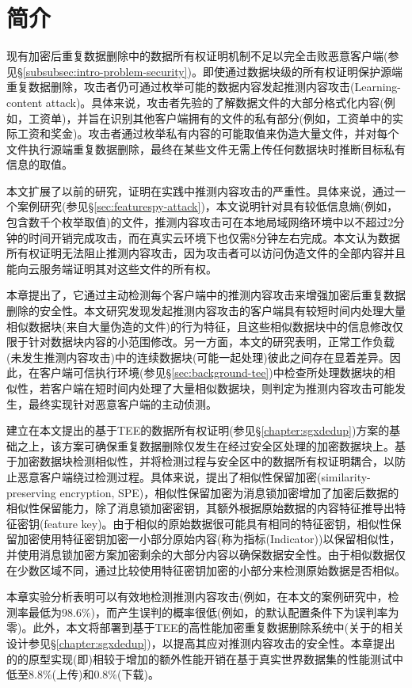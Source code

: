 \section{简介}
\label{sec:featurespy-intro}

现有加密后重复数据删除中的数据所有权证明机制不足以完全击败恶意客户端(参见\S\ref{subsubsec:intro-problem-security})。即使通过数据块级的所有权证明保护源端重复数据删除，攻击者仍可通过枚举可能的数据内容发起推测内容攻击(Learning-content attack)\cite{harnik2010side, zuo2018mitigating}。具体来说，攻击者先验的了解数据文件的大部分格式化内容(例如，工资单)，并旨在识别其他客户端拥有的文件的私有部分(例如，工资单中的实际工资和奖金)。攻击者通过枚举私有内容的可能取值来伪造大量文件，并对每个文件执行源端重复数据删除，最终在某些文件无需上传任何数据块时推断目标私有信息的取值。

本文扩展了以前的研究\cite{harnik2010side, zuo2018mitigating}，证明在实践中推测内容攻击的严重性。具体来说，通过一个案例研究(参见\S\ref{sec:featurespy-attack})，本文说明针对具有较低信息熵(例如，包含数千个枚举取值)的文件，推测内容攻击可在本地局域网络环境中以不超过2分钟的时间开销完成攻击，而在真实云环境下也仅需8分钟左右完成。本文认为数据所有权证明无法阻止推测内容攻击，因为攻击者可以访问伪造文件的全部内容并且能向云服务端证明其对这些文件的所有权。

本章提出了\sysnameF，它通过主动检测每个客户端中的推测内容攻击来增强加密后重复数据删除的安全性。本文研究发现发起推测内容攻击的客户端具有较短时间内处理大量相似数据块(来自大量伪造的文件)的行为特征，且这些相似数据块中的信息修改仅限于针对数据块内容的小范围修改。另一方面，本文的研究表明，正常工作负载(未发生推测内容攻击)中的连续数据块(可能一起处理)彼此之间存在显着差异。因此，\sysnameF 在客户端可信执行环境(参见\S\ref{sec:background-tee})中检查所处理数据块的相似性，若客户端在短时间内处理了大量相似数据块，则判定为推测内容攻击可能发生，最终实现针对恶意客户端的主动侦测。

\sysnameF 建立在本文提出的基于TEE的数据所有权证明(参见\S\ref{chapter:sgxdedup})方案的基础之上，该方案可确保重复数据删除仅发生在经过安全区处理的加密数据块上。\sysnameF 基于加密数据块检测相似性，并将检测过程与安全区中的数据所有权证明耦合，以防止恶意客户端绕过检测过程。具体来说，\sysnameF 提出了相似性保留加密(similarity-preserving
encryption, SPE)，相似性保留加密为消息锁加密增加了加密后数据的相似性保留能力，除了消息锁加密密钥，其额外根据原始数据的内容特征推导出特征密钥(feature key)。由于相似的原始数据很可能具有相同的特征密钥，相似性保留加密使用特征密钥加密一小部分原始内容(称为指标(Indicator))以保留相似性，并使用消息锁加密方案加密剩余的大部分内容以确保数据安全性。由于相似数据仅在少数区域不同，\sysnameF 通过比较使用特征密钥加密的小部分来检测原始数据是否相似。

本章实验分析表明\sysnameF 可以有效地检测推测内容攻击(例如，在本文的案例研究中，检测率最低为98.6\%)，而产生误判的概率很低(例如，\sysnameF 的默认配置条件下为误判率为零)。此外，本文将\sysnameF 部署到基于TEE的高性能加密重复数据删除系统\sysnameS 中(关于\sysnameS 的相关设计参见\S\ref{chapter:sgxdedup})，以提高其应对推测内容攻击的安全性。本章提出的\sysnameF 的原型实现(即\prototype)相较于\sysnameS 增加的额外性能开销在基于真实世界数据集的性能测试中低至8.8\%(上传)和0.8\%(下载)。